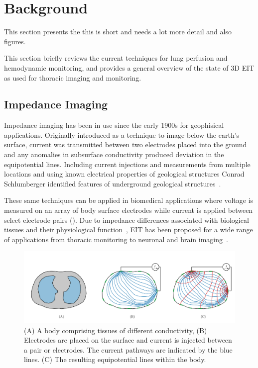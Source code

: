 \chapter{Background}
This section presents the 
this is short and needs a lot more detail and also figures.

This section briefly reviews the current techniques for lung perfusion and hemodynamic
monitoring, and provides a general overview 
of the state of 3D EIT as used for thoracic imaging and monitoring.


\section{Impedance Imaging}
\label{sec:impedance_imaging}
Impedance imaging has been in use since the early 1900s for geophisical applications.  
Originally introduced as a technique to image below the earth’s surface, 
current was transmitted between two electrodes placed into the ground and any 
anomalies in subsurface conductivity produced deviation 
in the equipotential lines. 
Including current injections and measurements from multiple locations and using known 
electrical properties of geological structures Conrad Schlumberger identified
features of underground geological structures~\parencite{allaud_schlumberger_1977}.

These same techniques can be applied in biomedical applications where
voltage is measured on an array of body surface electrodes 
while current is applied between select electrode pairs (). 
Due to impedance differences associated with biological tissues and their physiological 
function~\parencite{Geddes1967,McAdams1995},
EIT has been proposed for a wide range of applications from thoracic monitoring to neuronal and 
brain imaging~\parencite{Holder1992,Frerichs2016}. 

\begin{figure}
    \centering
   \includegraphics[width=\textwidth]{chapter2-background/imgs/current_and_equipotential_lines.pdf}
   \caption[Current and Equipotential lines]{\label{fig:cur_equip_line} 
   (A) A body comprising tissues of different conductivity, (B) Electrodes are placed on the surface 
   and current is injected between a pair or electrodes. The current pathways are indicated 
   by the blue lines. (C) The resulting equipotential lines within the body.}
\end{figure}

